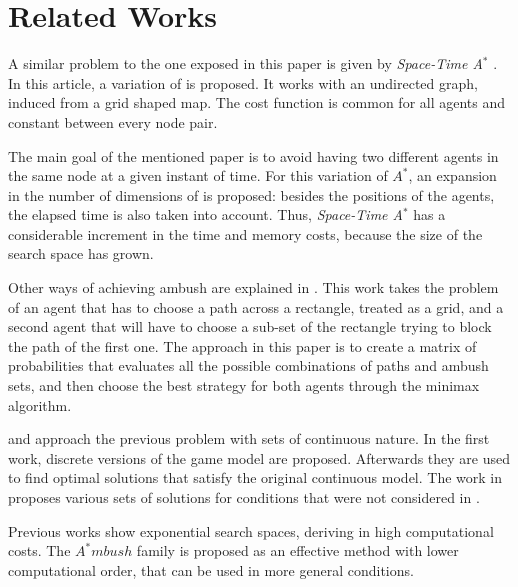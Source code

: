 \section{Related Works}
A similar problem to the one exposed in this paper is
given by \textit{Space-Time A$^*$} \cite{art3}. In this article, 
a variation of \astar is proposed. It works with an undirected
graph, induced from a grid shaped map. The cost function is common
for all agents and constant between every node pair. 

The main goal of the mentioned paper is to avoid having two 
different agents in the same node at a given instant of time.
For this variation of $A^*$, an expansion in the number of dimensions
of \astar	 is proposed: besides the positions of the agents, the elapsed
time is also taken into account. Thus, \textit{Space-Time A$^*$} has a 
considerable increment in the time and memory costs, because the size
of the search space has grown. 

Other ways of achieving ambush are explained in \cite{art5}. 
This work takes the problem of an agent that has to choose
a path across a rectangle, treated as a grid, and a second 
agent that will have to choose a sub-set of the rectangle trying
to block the path of the first one. The approach in this paper
is to create a matrix of probabilities that evaluates all the
possible combinations of paths and ambush sets, and then
choose the best strategy for both agents through the minimax
algorithm.

\cite{art6} and \cite{art7} approach the previous problem with
sets of continuous nature. In the first work, discrete versions of 
the game model are proposed. Afterwards they are
used to find optimal solutions that satisfy the original
continuous model. The work in \cite{art7} proposes various sets
of solutions for conditions that were not considered in \cite{art6}.

Previous works show exponential search spaces, deriving
in high computational costs. The $A^*mbush$ family is proposed
as an effective method with lower computational order, that can
be used in more general conditions.